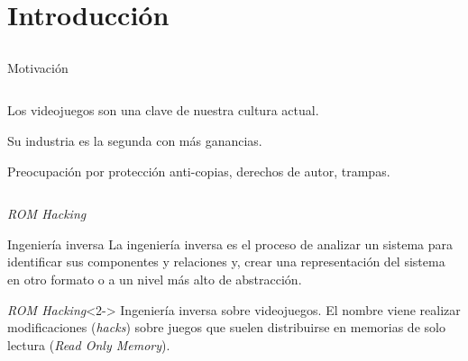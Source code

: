 
\section{Introducción}
\subsection{}

\begin{frame}{Motivación}
\begin{columns}
    \begin{column}{0.5\textwidth}
    \begin{wideitemize}
        \item<1-> Los videojuegos son una clave de nuestra cultura actual.

        \item<2-> Su industria es la segunda con más ganancias.

        \item<3-> Preocupación por protección anti-copias, derechos de autor, trampas.
    \end{wideitemize}
    \end{column}

    \begin{column}{0.5\textwidth}

    \end{column}
\end{columns}
\end{frame}

\begin{frame}{\textit{ROM Hacking}}
    \begin{block}{Ingeniería inversa}
        La ingeniería inversa es el proceso de analizar un sistema para identificar sus componentes y relaciones y, crear una representación del sistema en otro formato o a un nivel más alto de abstracción.
    \end{block}

    \begin{block}{\textit{ROM Hacking}}<2->
        Ingeniería inversa sobre videojuegos. El nombre viene realizar modificaciones (\textit{hacks}) sobre juegos que suelen distribuirse en memorias de solo lectura (\textit{Read Only Memory}).
    \end{block}
\end{frame}

